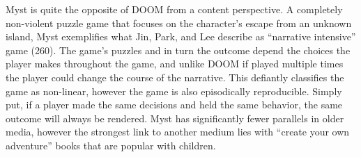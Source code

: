 Myst is quite the opposite of DOOM from a content perspective.  A completely non-violent puzzle game that focuses on the character’s escape from an unknown island, Myst exemplifies what Jin, Park, and Lee describe as “narrative intensive” game (260).  The game’s puzzles and in turn the outcome depend the choices the player makes throughout the game, and unlike DOOM if played multiple times the player could change the course of the narrative.  This defiantly classifies the game as non-linear, however the game is also episodically reproducible.  Simply put, if a player made the same decisions and held the same behavior, the same outcome will always be rendered.  Myst has significantly fewer parallels in older media, however the strongest link to another medium lies with “create your own adventure” books that are popular with children.

